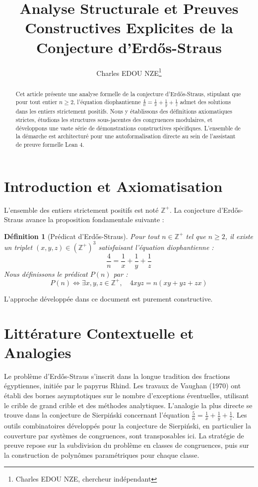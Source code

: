 \documentclass[11pt,a4paper]{article}
\title{Analyse Structurale et Preuves Constructives Explicites de la Conjecture d'Erd\H{o}s-Straus}
\author{Charles EDOU NZE\thanks{Charles EDOU NZE, chercheur indépendant}}
\date{}
\newtheorem{definition}[theorem]{Définition}
\begin{document}
\maketitle

\begin{abstract}
Cet article présente une analyse formelle de la conjecture d'Erd\H{o}s-Straus, stipulant que pour tout entier $n \geq 2$, l'équation diophantienne $\frac{4}{n} = \frac{1}{x} + \frac{1}{y} + \frac{1}{z}$ admet des solutions dans les entiers strictement positifs. Nous y établissons des définitions axiomatiques strictes, étudions les structures sous-jacentes des congruences modulaires, et développons une vaste série de démonstrations constructives spécifiques. L'ensemble de la démarche est architecturé pour une autoformalisation directe au sein de l'assistant de preuve formelle Lean 4.
\end{abstract}

\tableofcontents

\section{Introduction et Axiomatisation}

L'ensemble des entiers strictement positifs est noté $\mathbb{Z}^{+}$. La conjecture d'Erd\H{o}s-Straus avance la proposition fondamentale suivante :

\begin{definition}[Prédicat d'Erd\H{o}s-Straus]
Pour tout $n \in \mathbb{Z}^{+}$ tel que $n \geq 2$, il existe un triplet $(x, y, z) \in (\mathbb{Z}^{+})^3$ satisfaisant l'équation diophantienne :
\begin{equation}
\frac{4}{n} = \frac{1}{x} + \frac{1}{y} + \frac{1}{z}
\label{eq:erdos}
\end{equation}
Nous définissons le prédicat $P(n)$ par :
$$ P(n) \iff \exists x, y, z \in \mathbb{Z}^{+}, \quad 4xyz = n(xy + yz + zx) $$
\end{definition}

L'approche développée dans ce document est purement constructive.

\section{Littérature Contextuelle et Analogies}

Le problème d'Erd\H{o}s-Straus s'inscrit dans la longue tradition des fractions égyptiennes, initiée par le papyrus Rhind. Les travaux de Vaughan (1970) ont établi des bornes asymptotiques sur le nombre d'exceptions éventuelles, utilisant le crible de grand crible et des méthodes analytiques. L'analogie la plus directe se trouve dans la conjecture de Sierpi\'{n}ski concernant l'équation $\frac{5}{n} = \frac{1}{x} + \frac{1}{y} + \frac{1}{z}$. Les outils combinatoires développés pour la conjecture de Sierpi\'{n}ski, en particulier la couverture par systèmes de congruences, sont transposables ici. La stratégie de preuve repose sur la subdivision du problème en classes de congruences, puis sur la construction de polynômes paramétriques pour chaque classe.
\end{document}

